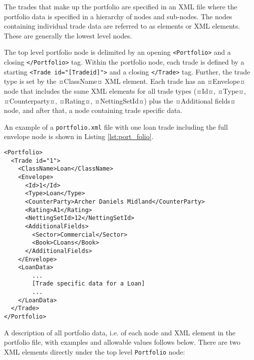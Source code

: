 The trades that make up the portfolio are specified in an XML file where the portfolio data is specified in a hierarchy of nodes and sub-nodes.  The nodes containing individual trade data are referred to as elements or XML elements. These are generally the lowest level nodes.

\vspace{1em}

The top level portfolio node is delimited by an opening {\tt <Portfolio>} and a closing {\tt </Portfolio>} tag. Within the portfolio node, each trade is defined by a starting {\tt <Trade id="[Tradeid]">} and a closing {\tt </Trade>} tag.  Further, the trade type is set by the ¤ClassName¤ XML element. Each trade has an ¤Envelope¤ node that includes the same XML elements  for all trade types (¤Id¤, ¤Type¤, ¤Counterparty¤, ¤Rating¤, ¤NettingSetId¤) plus the 
¤Additional fields¤ node, and after that, a node containing trade specific data.

\vspace{1em}
An example of a {\tt portfolio.xml} file with one loan trade including the full envelope node is shown in Listing \ref{lst:port_folio}.


\begin{lstlisting}[caption=Portfolio, label=lst:port_folio]
<Portfolio>
  <Trade id="1">
    <ClassName>Loan</ClassName>
    <Envelope>
      <Id>1</Id>
      <Type>Loan</Type>
      <CounterParty>Archer Daniels Midland</CounterParty>
      <Rating>A1</Rating>
      <NettingSetId>12</NettingSetId>
      <AdditionalFields>
        <Sector>Commercial</Sector>
        <Book>CLoans</Book>
      </AdditionalFields>
    </Envelope>
    <LoanData>
        ...
        [Trade specific data for a Loan]
        ...
    </LoanData>
  </Trade>
</Portfolio>
\end{lstlisting}

A description of all portfolio data, i.e. of each node and XML element in the portfolio file, with examples and allowable values follows below. There are two XML elements directly under the top level {\tt Portfolio} node:


